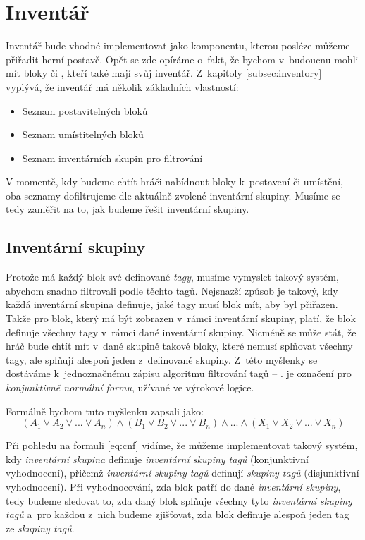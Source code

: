 
\section{Inventář}

Inventář bude vhodné implementovat jako komponentu, kterou posléze můžeme přiřadit herní postavě. Opět se zde opíráme o~fakt, že bychom v~budoucnu mohli mít bloky či \NPC{}, kteří také mají svůj inventář. Z~kapitoly \ref{subsec:inventory} vyplývá, že inventář má několik základních vlastností:

\begin{itemize}
	\item Seznam postavitelných bloků
	\item Seznam umístitelných bloků
	\item Seznam inventárních skupin pro filtrování
\end{itemize}

V momentě, kdy budeme chtít hráči nabídnout bloky k~postavení či umístění, oba seznamy dofiltrujeme dle aktuálně zvolené inventární skupiny. Musíme se tedy zaměřit na to, jak budeme řešit inventární skupiny.

\subsection{Inventární skupiny}

Protože má každý blok své definované \textit{tagy}, musíme vymyslet takový systém, abychom snadno filtrovali podle těchto tagů. Nejsnazší způsob je takový, kdy každá inventární skupina definuje, jaké tagy musí blok mít, aby byl přiřazen. Takže pro blok, který má být zobrazen v~rámci inventární skupiny, platí, že blok definuje všechny tagy v~rámci dané inventární skupiny. Nicméně se může stát, že hráč bude chtít mít v~dané skupině takové bloky, které nemusí splňovat všechny tagy, ale splňují alespoň jeden z~definované skupiny. Z~této myšlenky se dostáváme k~jednoznačnému zápisu algoritmu filtrování tagů -- \CNF{}. \CNF{} je označení pro \textit{konjunktivně normální formu}, užívané ve výrokové logice.

Formálně bychom tuto myšlenku zapsali jako:
\begin{equation}\label{eq:cnf}
	( A_1 \lor A_2 \lor ... \lor A_n ) \land ( B_1 \lor B_2 \lor ... \lor B_n ) \land ... \land ( X_1 \lor X_2 \lor ... \lor X_n )
\end{equation}


Při pohledu na formuli \ref{eq:cnf} vidíme, že můžeme implementovat takový systém, kdy \textit{inventární skupina} definuje \textit{inventární skupiny tagů} (konjunktivní vyhodnocení), přičemž \textit{inventární skupiny tagů} definují \textit{skupiny tagů} (disjunktivní vyhodnocení). Při vyhodnocování, zda blok patří do dané \textit{inventární skupiny}, tedy budeme sledovat to, zda daný blok splňuje všechny tyto \textit{inventární skupiny tagů} a~pro každou z~nich budeme zjišťovat, zda blok definuje alespoň jeden tag ze \textit{skupiny tagů}. 

